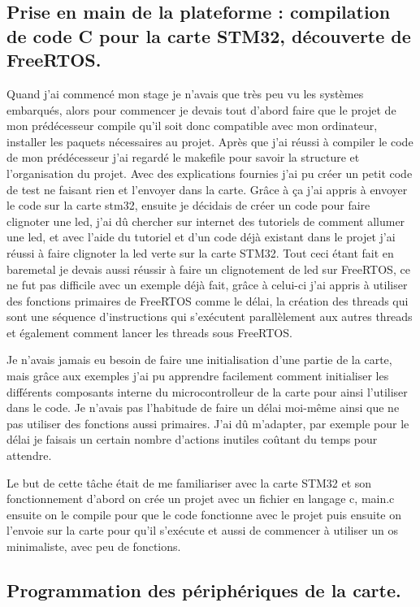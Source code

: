 \documentclass[a4paper]{article}
\begin{document}
\subsection{Prise en main de la plateforme : compilation de code C pour la carte STM32, découverte de FreeRTOS. }
Quand j'ai commencé mon stage je n'avais que très peu vu les systèmes embarqués, alors pour commencer je devais tout d'abord faire que le projet de mon prédécesseur compile qu'il soit donc compatible avec mon ordinateur, installer les paquets nécessaires au projet. Après que j'ai réussi à compiler le code de mon prédécesseur j'ai regardé le makefile pour savoir la structure et l'organisation du projet. Avec des explications fournies j'ai pu créer un petit code de test ne faisant rien et l'envoyer dans la carte. Grâce à ça j'ai appris à envoyer le code sur la carte stm32, ensuite je décidais de créer un code pour faire clignoter une led, j'ai dû chercher sur internet des tutoriels de comment allumer une led, et avec l'aide du tutoriel et d'un code déjà existant dans le projet j'ai réussi à faire clignoter la led verte sur la carte STM32. Tout ceci étant fait en baremetal je devais aussi réussir à faire un clignotement de led sur FreeRTOS, ce ne fut pas difficile avec un exemple déjà fait, grâce à celui-ci j'ai appris à utiliser des fonctions primaires de FreeRTOS comme le délai, la création des threads qui sont une séquence d'instructions qui s'exécutent parallèlement aux autres threads et également comment lancer les threads sous FreeRTOS.

Je n'avais jamais eu besoin de faire une initialisation d'une partie de la carte, mais grâce aux exemples j'ai pu apprendre facilement comment initialiser les différents composants interne du microcontrolleur de la carte pour ainsi l'utiliser dans le code. Je n'avais pas l'habitude de faire un délai moi-même ainsi que ne pas utiliser des fonctions aussi primaires. J'ai dû m'adapter, par exemple pour le délai je faisais un certain nombre d'actions inutiles coûtant du temps pour attendre.

Le but de cette tâche était de me familiariser avec la carte STM32 et son fonctionnement d'abord on crée un projet avec un fichier en langage c, main.c ensuite on le compile pour que le code fonctionne avec le projet puis ensuite on l'envoie sur la carte pour qu'il s'exécute et aussi de commencer à utiliser un os minimaliste, avec peu de fonctions.


\subsection{Programmation des périphériques de la carte.}
\end{document}
